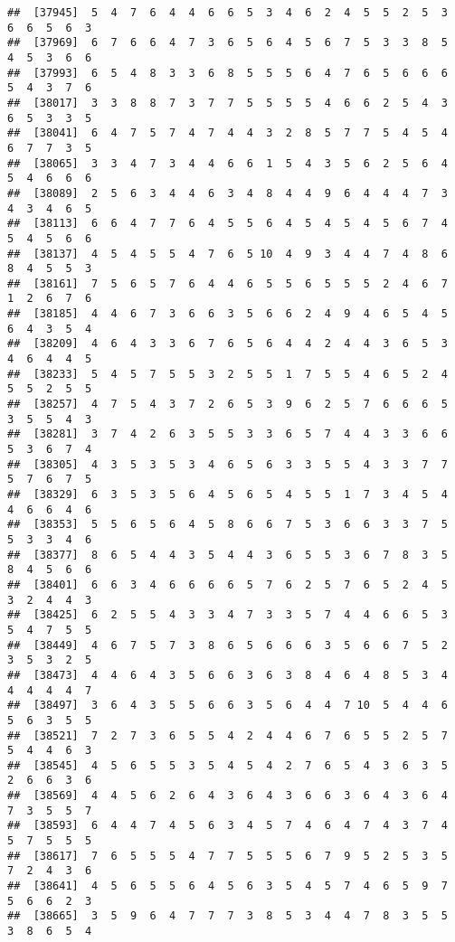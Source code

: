 \documentclass[
]{book}
\begin{document}
\begin{verbatim}
##  [37945]  5  4  7  6  4  4  6  6  5  3  4  6  2  4  5  5  2  5  3  6  6  5  6  3
##  [37969]  6  7  6  6  4  7  3  6  5  6  4  5  6  7  5  3  3  8  5  4  5  3  6  6
##  [37993]  6  5  4  8  3  3  6  8  5  5  5  6  4  7  6  5  6  6  6  5  4  3  7  6
##  [38017]  3  3  8  8  7  3  7  7  5  5  5  5  4  6  6  2  5  4  3  6  5  3  3  5
##  [38041]  6  4  7  5  7  4  7  4  4  3  2  8  5  7  7  5  4  5  4  6  7  7  3  5
##  [38065]  3  3  4  7  3  4  4  6  6  1  5  4  3  5  6  2  5  6  4  5  4  6  6  6
##  [38089]  2  5  6  3  4  4  6  3  4  8  4  4  9  6  4  4  4  7  3  4  3  4  6  5
##  [38113]  6  6  4  7  7  6  4  5  5  6  4  5  4  5  4  5  6  7  4  5  4  5  6  6
##  [38137]  4  5  4  5  5  4  7  6  5 10  4  9  3  4  4  7  4  8  6  8  4  5  5  3
##  [38161]  7  5  6  5  7  6  4  4  6  5  5  6  5  5  5  2  4  6  7  1  2  6  7  6
##  [38185]  4  4  6  7  3  6  6  3  5  6  6  2  4  9  4  6  5  4  5  6  4  3  5  4
##  [38209]  4  6  4  3  3  6  7  6  5  6  4  4  2  4  4  3  6  5  3  4  6  4  4  5
##  [38233]  5  4  5  7  5  5  3  2  5  5  1  7  5  5  4  6  5  2  4  5  5  2  5  5
##  [38257]  4  7  5  4  3  7  2  6  5  3  9  6  2  5  7  6  6  6  5  3  5  5  4  3
##  [38281]  3  7  4  2  6  3  5  5  3  3  6  5  7  4  4  3  3  6  6  5  3  6  7  4
##  [38305]  4  3  5  3  5  3  4  6  5  6  3  3  5  5  4  3  3  7  7  5  7  6  7  5
##  [38329]  6  3  5  3  5  6  4  5  6  5  4  5  5  1  7  3  4  5  4  4  6  6  4  6
##  [38353]  5  5  6  5  6  4  5  8  6  6  7  5  3  6  6  3  3  7  5  5  3  3  4  6
##  [38377]  8  6  5  4  4  3  5  4  4  3  6  5  5  3  6  7  8  3  5  8  4  5  6  6
##  [38401]  6  6  3  4  6  6  6  6  5  7  6  2  5  7  6  5  2  4  5  3  2  4  4  3
##  [38425]  6  2  5  5  4  3  3  4  7  3  3  5  7  4  4  6  6  5  3  5  4  7  5  5
##  [38449]  4  6  7  5  7  3  8  6  5  6  6  6  3  5  6  6  7  5  2  3  5  3  2  5
##  [38473]  4  4  6  4  3  5  6  6  3  6  3  8  4  6  4  8  5  3  4  4  4  4  4  7
##  [38497]  3  6  4  3  5  5  6  6  3  5  6  4  4  7 10  5  4  4  6  5  6  3  5  5
##  [38521]  7  2  7  3  6  5  5  4  2  4  4  6  7  6  5  5  2  5  7  5  4  4  6  3
##  [38545]  4  5  6  5  5  3  5  4  5  4  2  7  6  5  4  3  6  3  5  2  6  6  3  6
##  [38569]  4  4  5  6  2  6  4  3  6  4  3  6  6  3  6  4  3  6  4  7  3  5  5  7
##  [38593]  6  4  4  7  4  5  6  3  4  5  7  4  6  4  7  4  3  7  4  5  7  5  5  5
##  [38617]  7  6  5  5  5  4  7  7  5  5  5  6  7  9  5  2  5  3  5  7  2  4  3  6
##  [38641]  4  5  6  5  5  6  4  5  6  3  5  4  5  7  4  6  5  9  7  5  6  6  2  3
##  [38665]  3  5  9  6  4  7  7  7  3  8  5  3  4  4  7  8  3  5  5  3  8  6  5  4

\end{verbatim}
\end{document}
